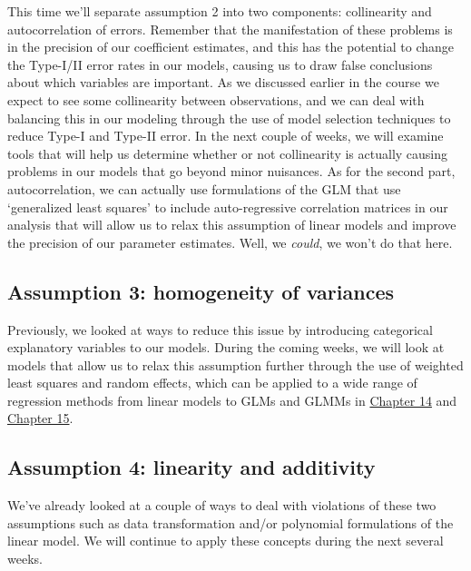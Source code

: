 \documentclass[
]{book}
\begin{document}
This time we'll separate assumption 2 into two components: collinearity and autocorrelation of errors. Remember that the manifestation of these problems is in the precision of our coefficient estimates, and this has the potential to change the Type-I/II error rates in our models, causing us to draw false conclusions about which variables are important. As we discussed earlier in the course we expect to see some collinearity between observations, and we can deal with balancing this in our modeling through the use of model selection techniques to reduce Type-I and Type-II error. In the next couple of weeks, we will examine tools that will help us determine whether or not collinearity is actually causing problems in our models that go beyond minor nuisances. As for the second part, autocorrelation, we can actually use formulations of the GLM that use `generalized least squares' to include auto-regressive correlation matrices in our analysis that will allow us to relax this assumption of linear models and improve the precision of our parameter estimates. Well, we \emph{could}, we won't do that here.

\hypertarget{assumption-3-homogeneity-of-variances}{%
\subsection{Assumption 3: homogeneity of variances}\label{assumption-3-homogeneity-of-variances}}

Previously, we looked at ways to reduce this issue by introducing categorical explanatory variables to our models. During the coming weeks, we will look at models that allow us to relax this assumption further through the use of weighted least squares and random effects, which can be applied to a wide range of regression methods from linear models to GLMs and GLMMs in \protect\hyperlink{Chapter14}{Chapter 14} and \protect\hyperlink{Chapter15}{Chapter 15}.

\hypertarget{assumption-4-linearity-and-additivity}{%
\subsection{Assumption 4: linearity and additivity}\label{assumption-4-linearity-and-additivity}}

We've already looked at a couple of ways to deal with violations of these two assumptions such as data transformation and/or polynomial formulations of the linear model. We will continue to apply these concepts during the next several weeks.
\end{document}
